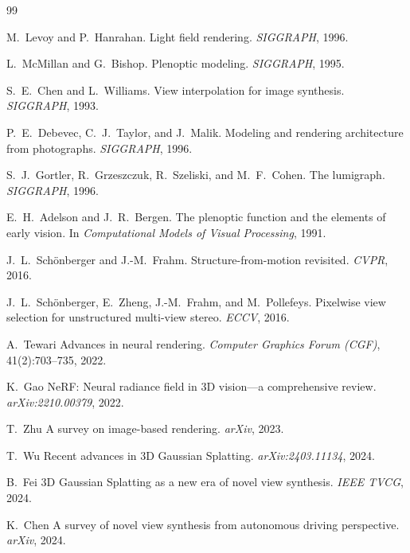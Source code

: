 
\begin{thebibliography}{99}

M.~Levoy and P.~Hanrahan.
Light field rendering.
\emph{SIGGRAPH}, 1996.


L.~McMillan and G.~Bishop.
Plenoptic modeling.
\emph{SIGGRAPH}, 1995.


S.~E.~Chen and L.~Williams.
View interpolation for image synthesis.
\emph{SIGGRAPH}, 1993.


P.~E.~Debevec, C.~J.~Taylor, and J.~Malik.
Modeling and rendering architecture from photographs.
\emph{SIGGRAPH}, 1996.


S.~J.~Gortler, R.~Grzeszczuk, R.~Szeliski, and M.~F.~Cohen.
The lumigraph.
\emph{SIGGRAPH}, 1996.


E.~H.~Adelson and J.~R.~Bergen.
The plenoptic function and the elements of early vision.
In \emph{Computational Models of Visual Processing}, 1991.


J.~L.~Sch\"{o}nberger and J.-M.~Frahm.
Structure-from-motion revisited.
\emph{CVPR}, 2016.


J.~L.~Sch\"{o}nberger, E.~Zheng, J.-M.~Frahm, and M.~Pollefeys.
Pixelwise view selection for unstructured multi-view stereo.
\emph{ECCV}, 2016.


A.~Tewari \etal
Advances in neural rendering.
\emph{Computer Graphics Forum (CGF)}, 41(2):703--735, 2022.


K.~Gao \etal
NeRF: Neural radiance field in 3D vision---a comprehensive review.
\emph{arXiv:2210.00379}, 2022.


T.~Zhu \etal
A survey on image-based rendering.
\emph{arXiv}, 2023.


T.~Wu \etal
Recent advances in 3D Gaussian Splatting.
\emph{arXiv:2403.11134}, 2024.


B.~Fei \etal
3D Gaussian Splatting as a new era of novel view synthesis.
\emph{IEEE TVCG}, 2024.


K.~Chen \etal
A survey of novel view synthesis from autonomous driving perspective.
\emph{arXiv}, 2024.



\end{thebibliography}
